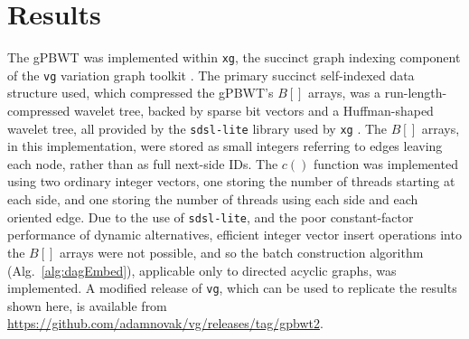 
\section{Results}

The gPBWT was implemented within \texttt{xg}, the succinct graph indexing component of the \texttt{vg} variation graph toolkit \cite{garrison2016vg}. The primary succinct self-indexed data structure used, which compressed the gPBWT's $B[]$ arrays, was a run-length-compressed wavelet tree, backed by sparse bit vectors and a Huffman-shaped wavelet tree, all provided by the \texttt{sdsl-lite} library used by \texttt{xg} \cite{gog2014theory}. The $B[]$ arrays, in this implementation, were stored as small integers referring to edges leaving each node, rather than as full next-side IDs. The $c()$ function was implemented using two ordinary integer vectors, one storing the number of threads starting at each side, and one storing the number of threads using each side and each oriented edge. Due to the use of \texttt{sdsl-lite}, and the poor constant-factor performance of dynamic alternatives, efficient integer vector insert operations into the $B[]$ arrays were not possible, and so the batch construction algorithm (Alg.~\ref{alg:dagEmbed}), applicable only to directed acyclic graphs, was implemented. A modified release of \texttt{vg}, which can be used to replicate the results shown here, is available from \url{https://github.com/adamnovak/vg/releases/tag/gpbwt2}.

